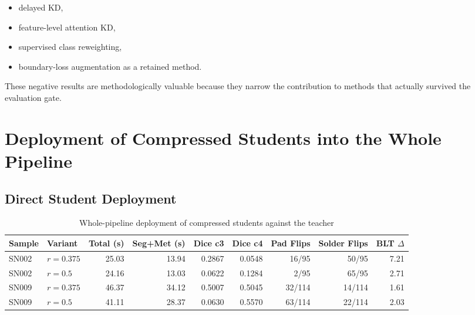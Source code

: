\begin{itemize}
\tightlist
\item
  delayed KD,
\item
  feature-level attention KD,
\item
  supervised class reweighting,
\item
  boundary-loss augmentation as a retained method.
\end{itemize}

These negative results are methodologically valuable because they narrow the contribution
to methods that actually survived the evaluation gate.

\hypertarget{deployment-of-compressed-students-into-the-whole-pipeline}{%
\section{Deployment of Compressed Students into the Whole
Pipeline}\label{deployment-of-compressed-students-into-the-whole-pipeline}}

\hypertarget{direct-student-deployment}{%
\subsection{Direct Student Deployment}\label{direct-student-deployment}}

\begin{table}[H]
\centering
\caption{Whole-pipeline deployment of compressed students against the teacher}
\label{tab:student-deploy}
\begin{adjustbox}{max width=\textwidth}
\renewcommand{\arraystretch}{1.15}
\begin{tabular}{ll rr rr rr r}
\toprule
\textbf{Sample} & \textbf{Variant} & \textbf{Total (s)} & \textbf{Seg+Met (s)} & \textbf{Dice c3} & \textbf{Dice c4} & \textbf{Pad Flips} & \textbf{Solder Flips} & \textbf{BLT $\Delta$} \\
\midrule
SN002 & $r{=}0.375$ & 25.03 & 13.94 & 0.2867 & 0.0548 & 16/95  & 50/95  & 7.21 \\
SN002 & $r{=}0.5$   & 24.16 & 13.03 & 0.0622 & 0.1284 & 2/95   & 65/95  & 2.71 \\
SN009 & $r{=}0.375$ & 46.37 & 34.12 & 0.5007 & 0.5045 & 32/114 & 14/114 & 1.61 \\
SN009 & $r{=}0.5$   & 41.11 & 28.37 & 0.0630 & 0.5570 & 63/114 & 22/114 & 2.03 \\
\bottomrule
\end{tabular}
\end{adjustbox}
\end{table}

